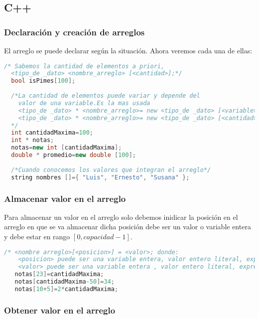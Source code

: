 \subsection{C++}

\subsubsection{Declaración y creación de arreglos}
El arreglo se puede declarar según la situación. Ahora veremos cada una de ellas:

\begin{lstlisting}[language=C++]
  /* Sabemos la cantidad de elementos a priori,  
  <tipo_de _dato> <nombre_arreglo> [<cantidad>];*/
  bool isPimes[100];
	
  /*La cantidad de elementos puede variar y depende del 
    valor de una variable.Es la mas usada
    <tipo_de _dato> * <nombre_arreglo>= new <tipo_de _dato> [<variable>];
    <tipo_de _dato> * <nombre_arreglo>= new <tipo_de _dato> [<cantidad>];
  */
  int cantidadMaxima=100;
  int * notas;
  notas=new int [cantidadMaxima]; 
  double * promedio=new double [100];
	
  /*Cuando conocemos los valores que integran el arreglo*/
  string nombres []={ "Luis", "Ernesto", "Susana" };
\end{lstlisting}

\subsubsection{Almacenar valor en el arreglo}
Para almacenar un valor en el arreglo solo debemos inidicar la posición en el arreglo en que se va almacenar dicha posición debe ser un valor o variable entera y debe estar en rango $[0,capacidad-1]$.

\begin{lstlisting}[language=C++]
   /* <nombre arreglo>[<posicion>] = <valor>; donde:
    <posicion> puede ser una variable entera, valor entero literal, expresion cuyo resultado sea entero 
    <valor> puede ser una variable entera , valor entero literal, expresion cuyo resultado sea entero */
   notas[23]=cantidadMaxima;
   notas[cantidadMaxima-50]=34;
   notas[10+5]=2*cantidadMaxima;
\end{lstlisting}

\subsubsection{Obtener valor en el arreglo}

